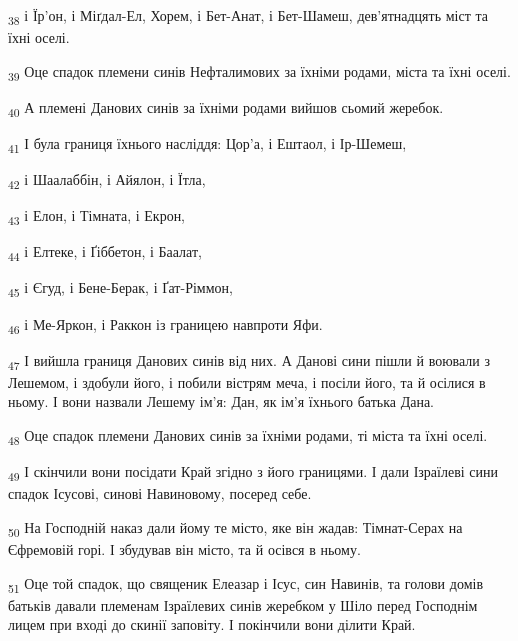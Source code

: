 \begin{tcolorbox}
\textsubscript{38} і Їр'он, і Міґдал-Ел, Хорем, і Бет-Анат, і Бет-Шамеш, дев'ятнадцять міст та їхні оселі.
\end{tcolorbox}
\begin{tcolorbox}
\textsubscript{39} Оце спадок племени синів Нефталимових за їхніми родами, міста та їхні оселі.
\end{tcolorbox}
\begin{tcolorbox}
\textsubscript{40} А племені Данових синів за їхніми родами вийшов сьомий жеребок.
\end{tcolorbox}
\begin{tcolorbox}
\textsubscript{41} І була границя їхнього насліддя: Цор'а, і Ештаол, і Ір-Шемеш,
\end{tcolorbox}
\begin{tcolorbox}
\textsubscript{42} і Шаалаббін, і Айялон, і Їтла,
\end{tcolorbox}
\begin{tcolorbox}
\textsubscript{43} і Елон, і Тімната, і Екрон,
\end{tcolorbox}
\begin{tcolorbox}
\textsubscript{44} і Елтеке, і Ґіббетон, і Баалат,
\end{tcolorbox}
\begin{tcolorbox}
\textsubscript{45} і Єгуд, і Бене-Берак, і Ґат-Ріммон,
\end{tcolorbox}
\begin{tcolorbox}
\textsubscript{46} і Ме-Яркон, і Раккон із границею навпроти Яфи.
\end{tcolorbox}
\begin{tcolorbox}
\textsubscript{47} І вийшла границя Данових синів від них. А Данові сини пішли й воювали з Лешемом, і здобули його, і побили вістрям меча, і посіли його, та й осілися в ньому. І вони назвали Лешему ім'я: Дан, як ім'я їхнього батька Дана.
\end{tcolorbox}
\begin{tcolorbox}
\textsubscript{48} Оце спадок племени Данових синів за їхніми родами, ті міста та їхні оселі.
\end{tcolorbox}
\begin{tcolorbox}
\textsubscript{49} І скінчили вони посідати Край згідно з його границями. І дали Ізраїлеві сини спадок Ісусові, синові Навиновому, посеред себе.
\end{tcolorbox}
\begin{tcolorbox}
\textsubscript{50} На Господній наказ дали йому те місто, яке він жадав: Тімнат-Серах на Єфремовій горі. І збудував він місто, та й осівся в ньому.
\end{tcolorbox}
\begin{tcolorbox}
\textsubscript{51} Оце той спадок, що священик Елеазар і Ісус, син Навинів, та голови домів батьків давали племенам Ізраїлевих синів жеребком у Шіло перед Господнім лицем при вході до скинії заповіту. І покінчили вони ділити Край.
\end{tcolorbox}
